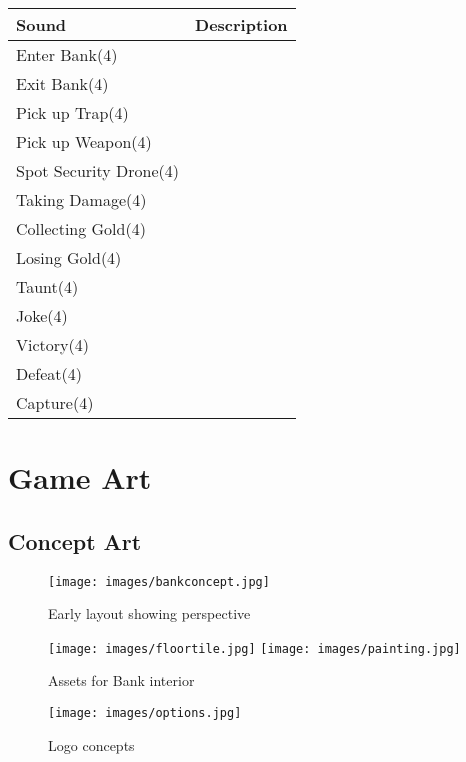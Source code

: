 \documentclass[10pt]{report}
\begin{document}
\begin{center}
    \begin{tabular}{| p{.45\linewidth} | p{.45\linewidth} |}
        \hline
        \textbf{Sound} & \textbf{Description} \\  \hline
        Enter Bank(4)   &   \\ \hline
        Exit Bank(4)    &   \\ \hline
        Pick up Trap(4) &   \\ \hline
        Pick up Weapon(4)   &   \\ \hline
        Spot Security Drone(4)  &   \\ \hline
        Taking Damage(4)    &   \\ \hline
        Collecting Gold(4)  &   \\ \hline
        Losing Gold(4)  &   \\ \hline
        Taunt(4)    &   \\ \hline
        Joke(4) &   \\ \hline
        Victory(4)  &   \\ \hline
        Defeat(4)   &   \\ \hline
        Capture(4)  &   \\ \hline
    \end{tabular}
\end{center}

\chapter{Game Art}

\section{Concept Art}

\begin{figure}[H]
	\texttt{[image: images/bankconcept.jpg]}
    \caption{Early layout showing perspective}
\end{figure}

\begin{figure}[H]
    \centering
    \texttt{[image: images/floortile.jpg]}
    \texttt{[image: images/painting.jpg]}
    \caption{Assets for Bank interior}
\end{figure}

\begin{figure}[H]
	\texttt{[image: images/options.jpg]}
    \caption{Logo concepts}
\end{figure}
\end{document}
